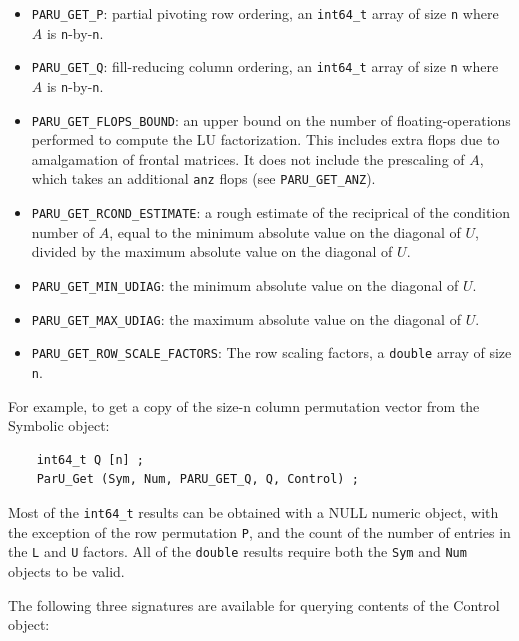 \documentclass[12pt]{article}
\begin{document}
\begin{itemize}
\item \verb'PARU_GET_P': partial pivoting row ordering,
    an \verb'int64_t' array of size \verb'n' where $A$ is
    \verb'n'-by-\verb'n'.

\item \verb'PARU_GET_Q': fill-reducing column ordering,
    an \verb'int64_t' array of size \verb'n' where $A$ is
    \verb'n'-by-\verb'n'.

\item \verb'PARU_GET_FLOPS_BOUND':
    an upper bound on the number of floating-operations
    performed to compute the LU factorization.  This includes
    extra flops due to amalgamation of frontal matrices.
    It does not include the prescaling of $A$, which takes
    an additional \verb'anz' flops (see \verb'PARU_GET_ANZ').

\item \verb'PARU_GET_RCOND_ESTIMATE': a rough estimate of the
    reciprical of the condition number of $A$, equal to the
    minimum absolute value on the diagonal of $U$,
    divided by the
    maximum absolute value on the diagonal of $U$.
\item \verb'PARU_GET_MIN_UDIAG':
    the minimum absolute value on the diagonal of $U$.
\item \verb'PARU_GET_MAX_UDIAG':
    the maximum absolute value on the diagonal of $U$.

\item \verb'PARU_GET_ROW_SCALE_FACTORS':
    The row scaling factors, a \verb'double' array of size \verb'n'.
\end{itemize}


For example, to get a copy of the size-n column permutation vector from the
Symbolic object:

    {\footnotesize
    \begin{verbatim}
    int64_t Q [n] ;
    ParU_Get (Sym, Num, PARU_GET_Q, Q, Control) ; \end{verbatim}}

Most of the \verb'int64_t' results can be obtained with a NULL numeric object,
with the exception of the row permutation \verb'P', and the count of the number
of entries in the \verb'L' and \verb'U' factors.
All of the \verb'double' results require both the \verb'Sym' and \verb'Num'
objects to be valid.

The following three signatures are available for querying contents of the
Control object:
\end{document}
